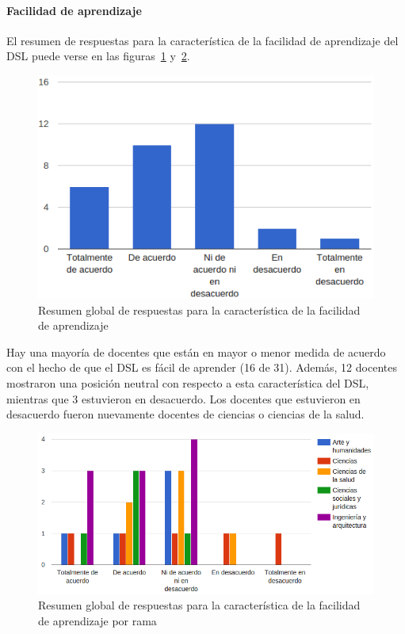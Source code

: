 \newpage
\paragraph*{Facilidad de aprendizaje}

El resumen de respuestas para la característica de la facilidad de aprendizaje del DSL puede verse en las figuras~\ref{fig:evalmetodo:dsl:aprendizaje} y~\ref{fig:evalmetodo:dsl:aprendizaje:rama}.

\begin{figure}[h]
  \begin{center}
    \includegraphics[scale=0.45]{C_DSL_aprendizaje.png}
  \end{center}
  \caption{Resumen global de respuestas para la característica de la facilidad de aprendizaje}
  \label{fig:evalmetodo:dsl:aprendizaje}
\end{figure}

Hay una mayoría de docentes que están en mayor o menor medida de acuerdo con el hecho de que el DSL es fácil de aprender (16 de 31). Además, 12 docentes mostraron una posición neutral con respecto a esta característica del DSL, mientras que 3 estuvieron en desacuerdo. Los docentes que estuvieron en desacuerdo fueron nuevamente docentes de ciencias o ciencias de la salud.

\begin{figure}[h]
  \begin{center}
    \includegraphics[scale=0.40]{C_DSL_aprendizaje_rama.png}
  \end{center}
  \caption{Resumen global de respuestas para la característica de la facilidad de aprendizaje por rama}
  \label{fig:evalmetodo:dsl:aprendizaje:rama}
\end{figure}

